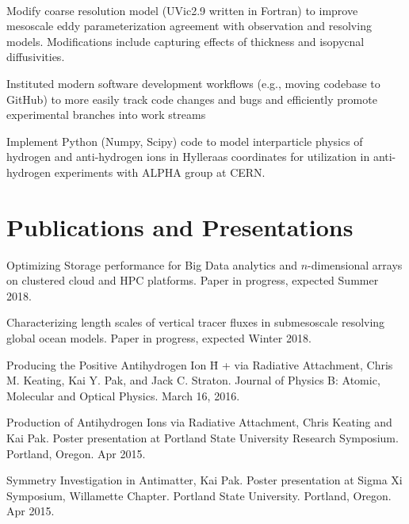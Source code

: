\documentclass[]{deedy-resume-openfont}
\begin{document}
\\
\begin{tightemize}
    \item Modify coarse resolution model (UVic2.9 written in Fortran) to improve mesoscale eddy parameterization agreement with observation and resolving models. Modifications include capturing effects of thickness and isopycnal diffusivities. 
    \item Instituted modern software development workflows (e.g., moving codebase to GitHub) to more 
    easily track code changes and bugs and efficiently promote experimental branches into work streams
\end{tightemize}
\sectionsep

\begin{tightemize}
    \item Implement Python (Numpy, Scipy) code to model interparticle physics of hydrogen and anti-hydrogen ions in Hylleraas coordinates for utilization in anti-hydrogen experiments with ALPHA group at CERN.
\end{tightemize}
\sectionsep


\section{Publications and Presentations}
\vspace{\topsep}
\begin{tightemize}
    \item Optimizing Storage performance for Big Data analytics and $n$-dimensional arrays on clustered cloud and HPC platforms. Paper in progress, expected Summer 2018.
    \item Characterizing length scales of vertical tracer fluxes in submesoscale resolving global ocean models. Paper in progress, expected Winter 2018.
    \item Producing the Positive Antihydrogen Ion H̄ + via Radiative Attachment, Chris M. Keating, Kai Y. Pak, and Jack C. Straton. Journal of Physics B: Atomic, Molecular and Optical Physics. March 16, 2016.
    \item Production of Antihydrogen Ions via Radiative Attachment, Chris Keating and Kai Pak. Poster presentation at Portland State University Research Symposium. Portland, Oregon. Apr 2015.
    \item Symmetry Investigation in Antimatter, Kai Pak. Poster presentation at Sigma Xi Symposium, Willamette
Chapter. Portland State University. Portland, Oregon. Apr 2015.
\end{tightemize}
\end{document}
